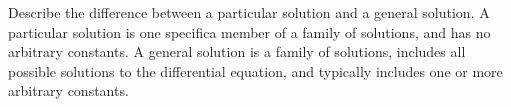 {
Describe the difference between a particular solution and a general solution.
}
{
A particular solution is one specifica member of a family of solutions, and has no arbitrary constants.  A general solution is a family of solutions, includes all possible solutions to the differential equation, and typically includes one or more arbitrary constants.
}
